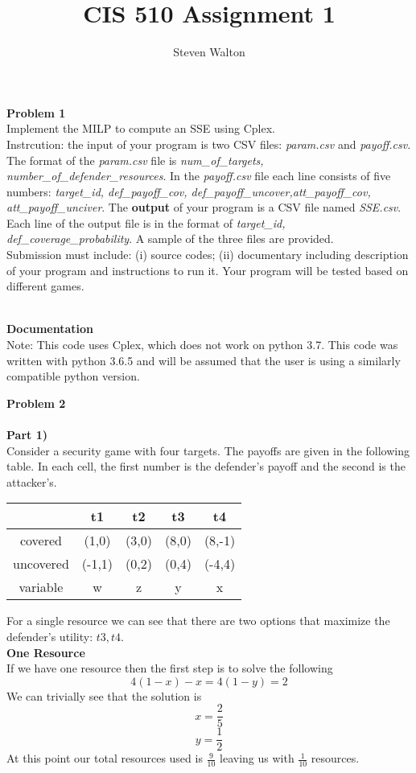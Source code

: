 \documentclass[12pt,letter]{article}
\newcommand{\problem}[1]{\vspace{3mm}\Large\textbf{{Problem {#1}\vspace{3mm}}}\normalsize\\}
\newcommand{\ppart}[1]{\vspace{2mm}\large\textbf{\\Part {#1})\vspace{2mm}}\normalsize\\}
\newcommand{\documentation}[1]{\vspace{2mm}\large\textbf{\\Documentation{#1}\vspace{2mm}}\normalsize\\}
\begin{document}
\title{CIS 510 Assignment 1}
\author{Steven Walton}
\maketitle
\problem{1}
Implement the MILP to compute an SSE using Cplex.
\\
Instrcution: the input of your program is two CSV files: \textit{param.csv} and
\textit{payoff.csv}. The format of the \textit{param.csv} file is 
\textit{num\_of\_targets, number\_of\_defender\_resources}. In the \textit{payoff.csv} file
each line consists of five numbers: \textit{target\_id, def\_payoff\_cov, 
def\_payoff\_uncover,att\_payoff\_cov, att\_payoff\_unciver}. The \textbf{output}
of your program is a CSV file named \textit{SSE.csv}. Each line of the output file 
is in the format of \textit{target\_id, def\_coverage\_probability}. A sample
of the three files are provided. 
\\
Submission must include: (i) source codes; (ii) documentary including description
of your program and instructions to run it. Your program will be tested based on
different games.

\documentation{}
Note: This code uses Cplex, which does not work on python 3.7. This code was
written with python 3.6.5 and will be assumed that the user is using a similarly 
compatible python version.

\problem{2}
\ppart{1}
Consider a security game with four targets. The payoffs are given in the following 
table. In each cell, the first number is the defender's payoff and the second is
the attacker's.
\begin{figure*}[h]
\centering
\begin{tabular}{|c|c|c|c|c|}
    \hline
    & t1 & t2 & t3 & t4\\
    \hline
    covered & (1,0) & (3,0) & (8,0) & (8,-1)\\
    \hline
    uncovered & (-1,1) & (0,2) & (0,4) & (-4,4)\\
    \hline
    variable  & w & z & y & x\\
    \hline
\end{tabular}
\end{figure*}

For a single resource we can see that there are two options that maximize 
the defender's utility: ${t3,t4}$. 
\\
\large\textbf{One Resource}\normalsize
\\

If we have one resource then the first step is to solve the following
\[
    4(1-x) - x = 4(1-y) = 2
\]
We can trivially see that the solution is
\[
    x = \frac25
\]\[
    y = \frac12
\]
At this point our total resources used is $\frac{9}{10}$ leaving us with $\frac{1}{10}$ 
resources.
\end{document}

